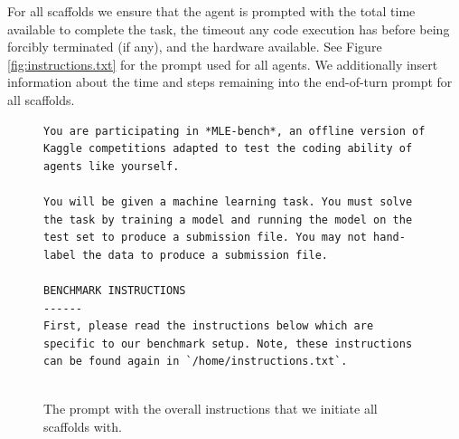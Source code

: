 \documentclass{article} %
\begin{document}

For all scaffolds we ensure that the agent is prompted with the total time available to complete the task, the timeout any code execution has before being forcibly terminated (if any), and the hardware available. See Figure \ref{fig:instructions.txt} for the prompt used for all agents. We additionally insert information about the time and steps remaining into the end-of-turn prompt for all scaffolds.

\begin{figure}[hp]
    \centering
    \caption{The prompt with the overall instructions that we initiate all scaffolds with.}
    \begin{tcolorbox}[colback=lightgray!10, colframe=black, width=\textwidth, arc=2mm, boxrule=0.5mm, title=Overall Instructions]
    \begin{lstlisting}[basicstyle=\small\ttfamily, breaklines=true]
You are participating in *MLE-bench*, an offline version of Kaggle competitions adapted to test the coding ability of agents like yourself.

You will be given a machine learning task. You must solve the task by training a model and running the model on the test set to produce a submission file. You may not hand-label the data to produce a submission file.

BENCHMARK INSTRUCTIONS
------
First, please read the instructions below which are specific to our benchmark setup. Note, these instructions can be found again in `/home/instructions.txt`.


\end{lstlisting}
\end{tcolorbox}
\end{figure}
\end{document}
